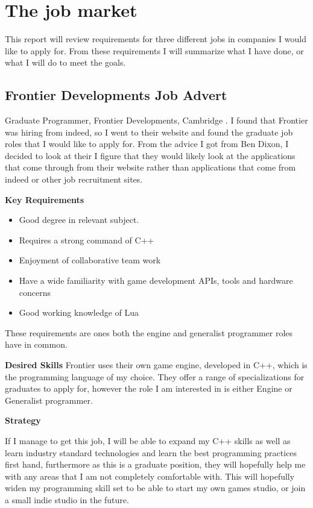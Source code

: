 \documentclass{scrartcl}
\begin{document}
\section{The job market}
This report will review requirements for three different jobs in companies I would like to apply for. From these requirements I will summarize what I have done, or what I will do to meet the goals. 


\subsection{Frontier Developments Job Advert}
Graduate Programmer, Frontier Developments, Cambridge  \cite{JobOne}. 
I found that Frontier was hiring from indeed, so I went to their website and found the graduate job roles that I would like to apply for.
From the advice I got from Ben Dixon, I decided to look at their
I figure that they would likely look at the applications that come through from their website rather than applications that come from indeed or other job recruitment sites.


\textbf{Key Requirements}
\begin{itemize}
	\item Good degree in relevant subject.
	\item Requires a strong command of C++
	\item Enjoyment of collaborative team work
	\item Have a wide familiarity with game development APIs, tools and hardware concerns
	\item Good working knowledge of Lua
\end{itemize}
These requirements are ones both the engine and generalist programmer roles have in common.

\textbf{Desired Skills}
Frontier uses their own game engine, developed in C++, which is the programming language of my choice.
They offer a range of specializations for graduates to apply for, however the role I am interested in is either Engine or Generalist programmer.

\textbf{Strategy} 

If I manage to get this job, I will be able to expand my C++ skills as well as learn industry standard technologies and learn the best programming practices first hand, furthermore as this is a graduate position, they will hopefully help me with any areas that I am not completely comfortable with.
This will hopefully widen my programming skill set to be able to start my own games studio, or join a small indie studio in the future.
\end{document}

